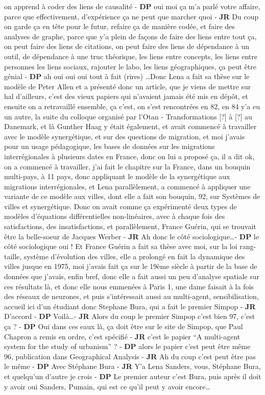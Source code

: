 \documentclass[12pt]{article}
\begin{document}
on apprend à coder des liens de causalité - \textbf{DP} oui moi ça m'a parlé votre affaire, parce que effectivement, d'expérience ça ne peut que marcher quoi - \textbf{JR} Du coup on garde ça en tête pour le futur, refaire ça de manière codée, et faire des analyses de graphe, parce que y'a plein de façons de faire des liens entre tout ça, on peut faire des liens de citations, on peut faire des liens de dépendance à un outil, de dépendance à une truc théorique, les liens entre concepts, les liens entre personnes les liens sociaux, rajouter le labo, les liens géographiques, ça peut être génial - \textbf{DP} ah oui oui oui tout à fait (rires) \ldots Donc Lena a fait sa thèse sur le modèle de Peter Allen et a présenté donc un article, que je viens de mettre sur hal d'ailleurs, c'est des vieux papiers qui n'avaient jamais été mis en dépôt, et ensuite on a retravaillé ensemble, ça c'est, on s'est rencontrées en 82, en 84 y'a eu un autre, la suite du colloque organisé par l'Otan - Transformations [?] à [?] au Danemark, et là Gunther Haag y était également, et avait commencé à travailler avec le modèle synergétique, et sur des questions de migration, et moi j'avais pour un usage pédagogique, les bases de données sur les migrations interrégionales à plusieurs dates en France, donc on lui a proposé ça, il a dit ok, on a commencé à travailler, j'ai fait le chapitre sur la France, dans un bouquin multi-pays, à 11 pays, donc appliquant le modèle de la synergétique aux migrations interrégionales, et Lena parallèlement, a commencé à appliquer une variante de ce modèle aux villes, dont elle a fait son bouquin, 92, sur Systèmes de villes et synergétique. Donc on avait comme ça expérimenté deux types de modèles d'équations différentielles non-linéaires, avec à chaque fois des satisfactions, des insatisfactions, et parallèlement, France Guérin, qui se trouvait être la belle-soeur de Jacques Werber - \textbf{JR} Ah donc le côté sociologique\ldots - \textbf{DP} le côté sociologique oui ! Et France Guérin a fait sa thèse avec moi, sur la loi rang-taille, système d'évolution des villes, elle a prolongé en fait la dynamique des villes jusque en 1975, moi j'avais fait ça sur le 19ème siècle à partir de la base de données que j'avais, enfin bref, donc elle a fait aussi un peu d'analyse spatiale sur ces résultats là, et donc elle nous emmenées à Paris 1, une dame faisait à la fois des réseaux de neurones, et puis s'intéressait aussi au multi-agent, sensibilisation, accueil ici d'un étudiant donc Stephane Bura, qui a fait le premier Simpop - \textbf{JR} D'accord - \textbf{DP} Voilà\ldots - \textbf{JR} Alors du coup le premier Simpop c'est bien 97, c'est ça ? - \textbf{DP} Oui dans ces eaux là, ça doit être sur le site de Simpop, que Paul Chapron a remis en ordre, c'est spécifié - \textbf{JR} c'est le papier ``A multi-agent system for the study of urbanism'' ? - \textbf{DP} alors le papier c'est peut être même 96, publication dans Geographical Analysis - \textbf{JR} Ah du coup c'est peut être pas le même - \textbf{DP} Avec Stéphane Bura - \textbf{JR} Y'a Lena Sanders, vous, Stéphane Bura, et quelqu'un d'autre je crois - \textbf{DP} Le premier auteur c'est Bura, puis après il doit y avoir oui Sanders, Pumain, qui est ce qu'il peut y avoir encore\ldots 
\end{document}
